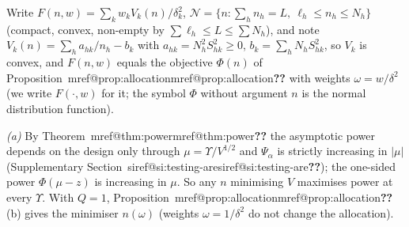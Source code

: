 \documentclass[pdflatex,sn-mathphys-num,iicol]{sn-jnl}
\makeatletter
\theoremstyle{thmstyleone}
\theoremstyle{thmstyletwo}
\theoremstyle{thmstylethree}
\newcommand{\SIref}[1]{\ifcsname siref@#1\endcsname\csname siref@#1\endcsname\else\textbf{??}\fi}
\newcommand{\Mref}[1]{\ifcsname mref@#1\endcsname\csname mref@#1\endcsname\else\textbf{??}\fi}
\makeatother
\begin{document}
Write $F(n,w)=\sum_kw_kV_k(n)/\delta_k^2$, $\mathcal N=\{n:\sum_hn_h=L,\ \ell_h\le n_h\le N_h\}$ (compact, convex, non-empty by $\sum\ell_h\le L\le\sum N_h$), and note $V_k(n)=\sum_ha_{hk}/n_h-b_k$ with $a_{hk}=N_h^2S^2_{hk}\ge0$, $b_k=\sum_hN_hS^2_{hk}$, so $V_k$ is convex, and $F(n,w)$ equals the objective $\Phi(n)$ of Proposition~\Mref{prop:allocation} with weights $\omega=w/\delta^2$ (we write $F(\cdot,w)$ for it; the symbol $\Phi$ without argument $n$ is the normal distribution function).

\emph{(a)} By Theorem~\Mref{thm:power} the asymptotic power depends on the design only through $\mu=\Upsilon/V^{1/2}$ and $\Psi_\alpha$ is strictly increasing in $|\mu|$ (Supplementary Section~\SIref{si:testing-are}); the one-sided power $\Phi(\mu-z)$ is increasing in $\mu$. So any $n$ minimising $V$ maximises power at every $\Upsilon$. With $Q=1$, Proposition~\Mref{prop:allocation}(b) gives the minimiser $n(\omega)$ (weights $\omega=1/\delta^2$ do not change the allocation).
\end{document}
